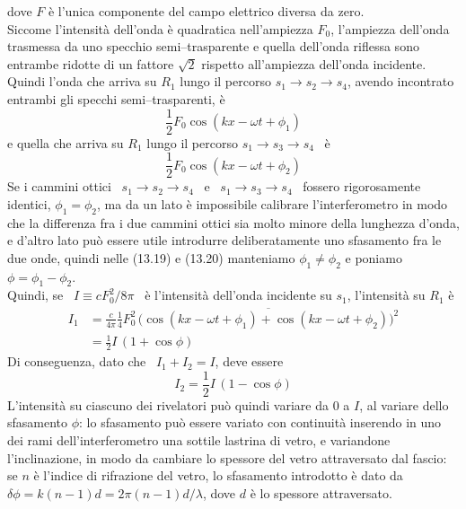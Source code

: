 dove $F$ \`e l'unica componente del campo elettrico diversa da zero.\\
Siccome l'intensit\`a dell'onda \`e quadratica nell'ampiezza $F_0$, l'ampiezza
dell'onda trasmessa da uno specchio semi--trasparente e quella dell'onda
riflessa sono entrambe ridotte di un fattore $\sqrt2$ rispetto all'ampiezza
dell'onda incidente. Quindi l'onda che arriva su $R_1$ lungo il percorso
$s_1\to s_2\to s_4$, avendo incontrato entrambi gli specchi semi--trasparenti,
\`e
\begin{equation}
  \frac{1}{2}F_0\cos(kx-\omega t+\phi_1)
  \tag{13.19}
\end{equation}
e quella che arriva su $R_1$ lungo il percorso $s_1\to s_3\to s_4$ \ \`e
\begin{equation}
  \frac{1}{2}F_0\cos(kx-\omega t+\phi_2)
  \tag{13.20}
\end{equation}
Se i cammini ottici \ $s_1\to s_2\to s_4$ \ e \ $s_1\to s_3\to s_4$ \ fossero
rigorosamente identici, $\phi_1=\phi_2$, ma da un lato \`e impossibile calibrare
l'interferometro in modo che la differenza fra i due cammini ottici sia molto
minore della lunghezza d'onda, e d'altro lato pu\`o essere utile introdurre
deliberatamente uno sfasamento fra le due onde, quindi nelle (13.19) e (13.20)
manteniamo $\phi_1\ne\phi_2$ e poniamo $\phi=\phi_1-\phi_2$.\\
Quindi, se \ $I\equiv cF_0^2/8\pi$ \ \`e l'intensit\`a dell'onda incidente su
$s_1$, l'intensit\`a su $R_1$ \`e
\begin{equation}
  \begin{aligned}
    I_1&=\frac{c}{4\pi}\frac{1}{4}F_0^2\,
    \overline{\big(\cos(kx-\omega t+\phi_1)+\cos(kx-\omega t+\phi_2)\big)^2}\\
    &=\frac{1}{2}I\,(1+\cos\phi)
  \end{aligned}
  \tag{13.21}
\end{equation}
Di conseguenza, dato che \ $I_1+I_2=I$, deve essere
\begin{equation}
  I_2=\frac{1}{2}I\,(1-\cos\phi)
  \tag{13.22}
\end{equation}
L'intensit\`a su ciascuno dei rivelatori pu\`o quindi variare da 0 a $I$, al
variare dello sfasamento $\phi$: lo sfasamento pu\`o essere variato con
continuit\`a inserendo in uno dei rami dell'interferometro una sottile lastrina
di vetro, e variandone l'inclinazione, in modo da cambiare lo spessore del vetro
attraversato dal fascio: se $n$ \`e l'indice di rifrazione del vetro, lo
sfasamento introdotto \`e dato da \ $\delta\phi=k(n-1)d=2\pi(n-1)d/\lambda$,
dove $d$ \`e lo spessore attraversato.
